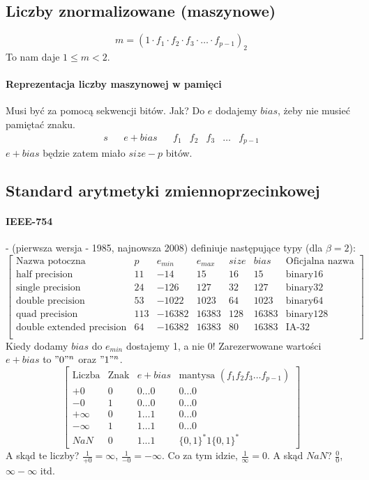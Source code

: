 \documentclass{article}
\begin{document}
\subsection{Liczby znormalizowane (maszynowe)}
$$ m=(1\cdot f_1\cdot f_2\cdot f_3\cdot \ldots\cdot f_{p-1})_2 $$
To nam daje $ 1\le m<2 $.
\paragraph{Reprezentacja liczby maszynowej w pamięci}
Musi być za pomocą sekwencji bitów. Jak?
Do $e$ dodajemy $bias$, żeby nie musieć pamiętać znaku.
$$\begin{array}{|c|ccc|ccccc|}
s&&e+bias&&f_1&f_2&f_3&\ldots&f_{p-1}
\end{array}$$
$ e + bias $ będzie zatem miało $ size - p $ bitów.
\subsection{Standard arytmetyki zmiennoprzecinkowej}
\paragraph{IEEE-754} - (pierwsza wersja - 1985, najnowsza 2008)
definiuje następujące typy (dla $ \beta =2 $):
$$\begin{bmatrix}
\text{Nazwa potoczna} & p&e_{min}&e_{max}&size&bias&\text{Oficjalna nazwa}\\
\text{half precision}&11&-14&15&16&15&\text{binary16}\\
\text{single precision}&24&-126&127&32&127&\text{binary32}\\
\text{double precision}&53&-1022&1023&64&1023&\text{binary64}\\
\text{quad precision}&113&-16382&16383&128&16383&\text{binary128}\\
\text{double extended precision}&64&-16382&16383&80&16383&\text{IA-32}\\
\end{bmatrix}$$
Kiedy dodamy $ bias $ do $ e_{min} $ dostajemy 1, a nie 0!
Zarezerwowane wartości $ e+bias $ to $"0"^n$ oraz $ "1"^n $.
$$
\begin{bmatrix}
\text{Liczba}&\text{Znak}&e+bias&\text{mantysa } (f_1f_2f_3\ldots f_{p-1})\\
+0&0&0\ldots0&0\ldots0\\
-0&1&0\ldots0&0\ldots0\\
+\infty&0&1\ldots1&0\ldots0\\
-\infty&1&1\ldots1&0\ldots0\\
NaN&0&1...1&\{0,1\}^*1\{0,1\}^*
\end{bmatrix}
$$
A skąd te liczby? $ \frac{1}{+0} = \infty $, $\frac{1}{-0}=-\infty$. Co za tym idzie, $ \frac1\infty =0$. A skąd $ NaN $? $ \frac00 $, $ \infty-\infty $ itd.
\end{document}
